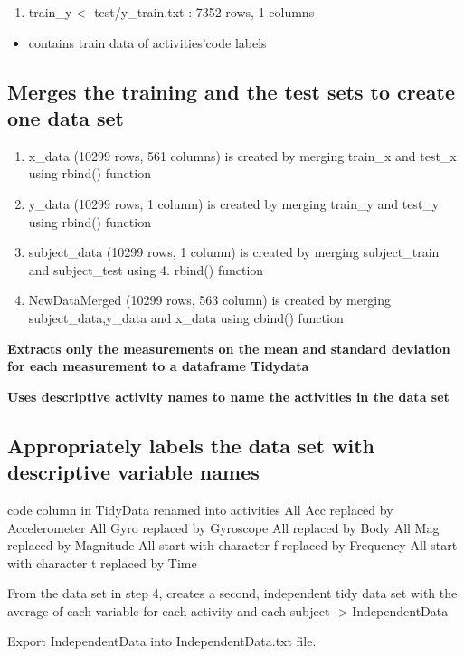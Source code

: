 \documentclass[
]{article}
\providecommand{\tightlist}{%
  \setlength{\itemsep}{0pt}\setlength{\parskip}{0pt}}
\begin{document}
\begin{enumerate}
\def\labelenumi{\arabic{enumi}.}
\setcounter{enumi}{7}
\tightlist
\item
  train\_y \textless- test/y\_train.txt : 7352 rows, 1 columns
\end{enumerate}

\begin{itemize}
\tightlist
\item
  contains train data of activities'code labels
\end{itemize}

\hypertarget{merges-the-training-and-the-test-sets-to-create-one-data-set}{%
\subsection{Merges the training and the test sets to create one data
set}\label{merges-the-training-and-the-test-sets-to-create-one-data-set}}

\begin{enumerate}
\def\labelenumi{\arabic{enumi}.}
\tightlist
\item
  x\_data (10299 rows, 561 columns) is created by merging train\_x and
  test\_x using rbind() function
\item
  y\_data (10299 rows, 1 column) is created by merging train\_y and
  test\_y using rbind() function
\item
  subject\_data (10299 rows, 1 column) is created by merging
  subject\_train and subject\_test using 4. rbind() function
\item
  NewDataMerged (10299 rows, 563 column) is created by merging
  subject\_data,y\_data and x\_data using cbind() function
\end{enumerate}

\textbf{Extracts only the measurements on the mean and standard
deviation for each measurement to a dataframe Tidydata}

\textbf{Uses descriptive activity names to name the activities in the
data set}

\hypertarget{appropriately-labels-the-data-set-with-descriptive-variable-names}{%
\subsection{Appropriately labels the data set with descriptive variable
names}\label{appropriately-labels-the-data-set-with-descriptive-variable-names}}

code column in TidyData renamed into activities All Acc replaced by
Accelerometer All Gyro replaced by Gyroscope All replaced by Body All
Mag replaced by Magnitude All start with character f replaced by
Frequency All start with character t replaced by Time

From the data set in step 4, creates a second, independent tidy data set
with the average of each variable for each activity and each subject
-\textgreater{} IndependentData

Export IndependentData into IndependentData.txt file.
\end{document}
